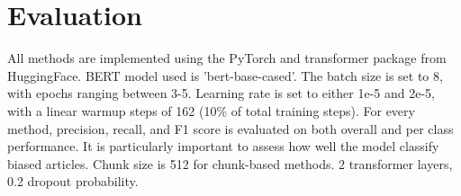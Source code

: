 \chapter{Evaluation}
\label{cha:6}

All methods are implemented using the PyTorch \cite{paszke-2017-pytorch} and transformer \cite{wolf-2020-huggingface} package from HuggingFace. BERT model used is 'bert-base-cased'. The batch size is set to 8, with epochs ranging between 3-5. Learning rate is set to either 1e-5 and 2e-5, with a linear warmup steps of 162 (10\% of total training steps). For every method, precision, recall, and F1 score is evaluated on both overall and per class performance. It is particularly important to assess how well the model classify biased articles. Chunk size is 512 for chunk-based methods. 2 transformer layers, 0.2 dropout probability.

